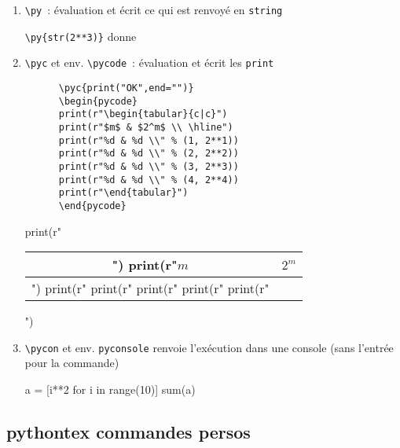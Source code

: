 \documentclass{article}
\begin{document}
  \begin{enumerate}
  \item \verb|\py|~: évaluation et écrit ce qui est renvoyé en \texttt{string}

    \verb|\py{str(2**3)}| donne 
    
  \item \verb|\pyc| et env. \verb|\pycode|~: évaluation et écrit les \texttt{print}
    
    \begin{Verbatim}
      \pyc{print("OK",end="")}
      \begin{pycode}
      print(r"\begin{tabular}{c|c}")
      print(r"$m$ & $2^m$ \\ \hline")
      print(r"%d & %d \\" % (1, 2**1))
      print(r"%d & %d \\" % (2, 2**2))
      print(r"%d & %d \\" % (3, 2**3))
      print(r"%d & %d \\" % (4, 2**4))
      print(r"\end{tabular}")
      \end{pycode}
    \end{Verbatim}
    
    \begin{pycode}
print(r"\begin{tabular}{c|c}")
print(r"$m$ & $2^m$ \\ \hline")
print(r"%
print(r"%
print(r"%
print(r"%
print(r"\end{tabular}") 
\end{pycode}

\item \verb|\pycon| et env. \verb|pyconsole| renvoie l'exécution
  dans une console (sans l'entrée pour la commande)

\begin{pyconsole}
a = [i**2 for i in range(10)]
sum(a)
\end{pyconsole}
\end{enumerate}

\subsection{pythontex commandes persos}
\end{document}
